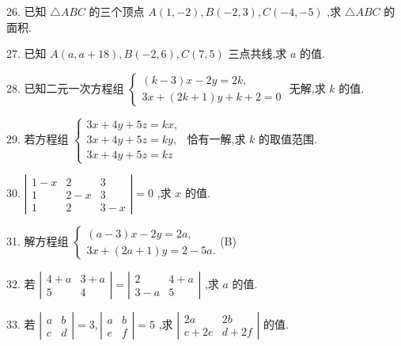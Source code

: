 \documentclass[10pt]{article}
\begin{document}
26. 已知 \(\bigtriangleup {ABC}\) 的三个顶点 \(A\left( {1, - 2}\right) ,B\left( {-2,3}\right) ,C\left( {-4, - 5}\right)\) ,求 \(\bigtriangleup {ABC}\) 的面积.

27. 已知 \(A\left( {a,a + {18}}\right) ,B\left( {-2,6}\right) ,C\left( {7,5}\right)\) 三点共线,求 \(a\) 的值.

28. 已知二元一次方程组 \(\left\{  \begin{array}{l} \left( {k - 3}\right) x - {2y} = {2k}, \\  {3x} + \left( {{2k} + 1}\right) y + k + 2 = 0 \end{array}\right.\) 无解,求 \(k\) 的值.

29. 若方程组 \(\left\{  \begin{array}{l} {3x} + {4y} + {5z} = {kx}, \\  {3x} + {4y} + {5z} = {ky}, \\  {3x} + {4y} + {5z} = {kz} \end{array}\right.\) 恰有一解,求 \(k\) 的取值范围.

30. \(\left| \begin{matrix} 1 - x & 2 & 3 \\  1 & 2 - x & 3 \\  1 & 2 & 3 - x \end{matrix}\right|  = 0\) ,求 \(x\) 的值.

31. 解方程组 \(\left\{  \begin{array}{l} \left( {a - 3}\right) x - {2y} = {2a}, \\  {3x} + \left( {{2a} + 1}\right) y = 2 - {5a}. \end{array}\right.\)(B)

32. 若 \(\left| \begin{matrix} 4 + a & 3 + a \\  5 & 4 \end{matrix}\right|  = \left| \begin{matrix} 2 & 4 + a \\  3 - a & 5 \end{matrix}\right|\) ,求 \(a\) 的值.

33. 若 \(\left| \begin{array}{ll} a & b \\  c & d \end{array}\right|  = 3,\left| \begin{array}{ll} a & b \\  e & f \end{array}\right|  = 5\) ,求 \(\left| \begin{matrix} {2a} & {2b} \\  c + {2e} & d + {2f} \end{matrix}\right|\) 的值.
\end{document}
